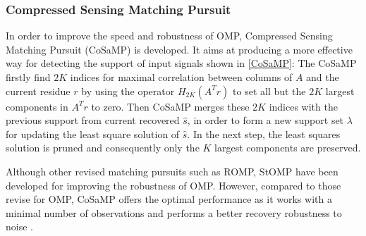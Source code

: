 \subsubsection{Compressed Sensing Matching Pursuit}
In order to improve the speed and robustness of OMP, Compressed Sensing Matching Pursuit (CoSaMP)\cite{needell2009cosamp} is developed. It aims at producing a more effective way for detecting the support of input signals shown in \ref{CoSaMP}: The CoSaMP firstly find $2K$ indices for maximal correlation between columns of $A$ and the current residue $r$ by using the operator $H_{2K}(A^T r)$ to set all but the $2K$ largest components in $A^T r$ to zero. Then CoSaMP merges these $2K$ indices with the previous support from current recovered $\hat s$, in order to form a new support set $\lambda$ for updating the least square solution of $\hat s$. In the next step, the least squares solution is pruned and consequently only the $K$ largest components are preserved.  

Although other revised matching pursuits such as ROMP\cite{needell2009uniform}, StOMP\cite{donoho2006sparse} have been developed for improving the robustness of OMP. However, compared to those revise for OMP, CoSaMP offers the optimal performance as it works with a minimal number of observations and performs a better recovery robustness to noise \cite{needell2009cosamp}.
